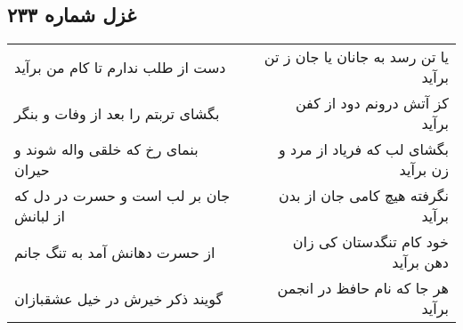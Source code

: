 \begin{center}
\section*{غزل شماره ۲۳۳}
\label{sec:sh233}
\begin{longtable}{l p{0.5cm} r}
دست از طلب ندارم تا کام من برآید
&&
یا تن رسد به جانان یا جان ز تن برآید
\\
بگشای تربتم را بعد از وفات و بنگر
&&
کز آتش درونم دود از کفن برآید
\\
بنمای رخ که خلقی واله شوند و حیران
&&
بگشای لب که فریاد از مرد و زن برآید
\\
جان بر لب است و حسرت در دل که از لبانش
&&
نگرفته هیچ کامی جان از بدن برآید
\\
از حسرت دهانش آمد به تنگ جانم
&&
خود کام تنگدستان کی زان دهن برآید
\\
گویند ذکر خیرش در خیل عشقبازان
&&
هر جا که نام حافظ در انجمن برآید
\\
\end{longtable}
\end{center}
